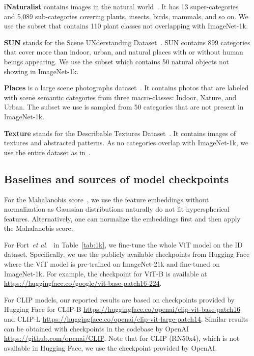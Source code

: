 \documentclass{article}
\def\etal{\emph{et al.}}
\begin{document}
\textbf{iNaturalist} contains images in the natural world~\cite{van2018inaturalist}. It has 13 super-categories and 5,089 sub-categories covering plants, insects, birds, mammals, and so on. We use the subset that contains 110 plant classes not overlapping with ImageNet-1k.

\textbf{SUN} stands for the Scene UNderstanding Dataset~\cite{xiao2010sun}. SUN contains 899 categories that cover more than indoor, urban, and natural places with or without human beings appearing. We use the subset which contains 50 natural objects not showing in ImageNet-1k.

\textbf{Places} is a large scene photographs dataset~\cite{zhou2017places}. It contains photos that are labeled with scene semantic categories from three macro-classes: Indoor, Nature, and Urban. The subset we use is sampled from 50 categories that are not present in ImageNet-1k.

\textbf{Texture} stands for the Describable Textures Dataset~\cite{cimpoi2014describing}. It contains images of textures and abstracted patterns. As no categories overlap with ImageNet-1k, we use the entire dataset as in~\cite{huang2021mos}.
\subsection{Baselines and sources of model checkpoints}
For the Mahalanobis score~\cite{lee2018simple}, we use the feature embeddings without  normalization as Gaussian distributions naturally do not fit hyperspherical features. Alternatively, one can normalize the embeddings first and then apply the Mahalanobis score. 

For Fort~\etal~\cite{fort2021exploring} in Table~\ref{tab:1k}, we fine-tune the whole ViT model on the ID dataset. Specifically, we use the publicly available checkpoints from Hugging Face where the ViT model is pre-trained on ImageNet-21k and fine-tuned on ImageNet-1k. For example, the checkpoint for ViT-B is available at \url{https://huggingface.co/google/vit-base-patch16-224}. 

For CLIP models, our reported results are based on checkpoints provided by Hugging Face for CLIP-B \url{https://huggingface.co/openai/clip-vit-base-patch16} and CLIP-L \url{https://huggingface.co/openai/clip-vit-large-patch14}. Similar results can be obtained with checkpoints in the codebase by OpenAI \url{https://github.com/openai/CLIP}. Note that for CLIP (RN50x4), which is not available in Hugging Face, we use the checkpoint provided by OpenAI. 
\end{document}
